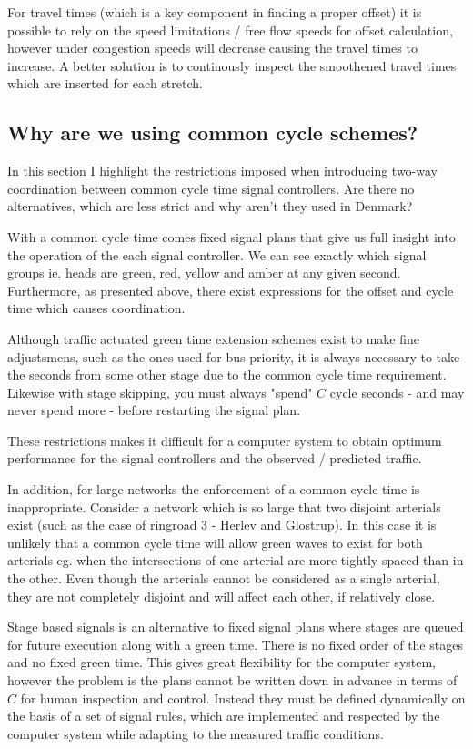 For travel times (which is a key component in finding a proper offset) it is possible to rely on the speed limitations / free flow speeds for offset calculation, however under congestion speeds will decrease causing the travel times to increase. A better solution is to continously inspect the smoothened travel times which are inserted for each stretch. 

\subsection*{Why are we using common cycle schemes?}
\label{phase_based}
In this section I highlight the restrictions imposed when introducing two-way coordination between common cycle time signal controllers. Are there no alternatives, which are less strict and why aren't they used in Denmark?

With a common cycle time comes fixed signal plans that give us full insight into the operation of the each signal controller. We can see exactly which signal groups ie. heads are green, red, yellow and amber at any given second. Furthermore, as presented above, there exist expressions for the offset and cycle time which causes coordination. 

Although traffic actuated green time extension schemes exist to make fine adjustsmens, such as the ones used for bus priority, it is always necessary to take the seconds from some other stage due to the common cycle time requirement. Likewise with stage skipping, you must always "spend" $C$ cycle seconds - and may never spend more - before restarting the signal plan.

These restrictions makes it difficult for a computer system to obtain optimum performance for the signal controllers and the observed / predicted traffic.

In addition, for large networks the enforcement of a common cycle time is inappropriate. Consider a network which is so large that two disjoint arterials exist (such as the case of ringroad 3 - Herlev and Glostrup). In this case it is unlikely that a common cycle time will allow green waves to exist for both arterials eg. when the intersections of one arterial are more tightly spaced than in the other. Even though the arterials cannot be considered as a single arterial, they are not completely disjoint and will affect each other, if relatively close.

Stage based signals is an alternative to fixed signal plans where stages are queued for future execution along with a green time. There is no fixed order of the stages and no fixed green time. This gives great flexibility for the computer system, however the problem is the plans cannot be written down in advance in terms of $C$ for human inspection and control. Instead they must be defined dynamically on the basis of a set of signal rules, which are implemented and respected by the computer system while adapting to the measured traffic conditions. 

